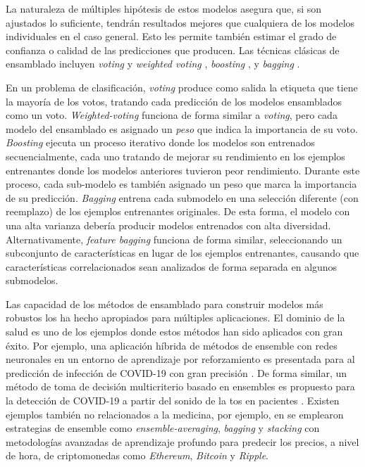 La naturaleza de múltiples hipótesis de estos modelos asegura que, si son ajustados lo suficiente, tendrán resultados mejores que cualquiera de los modelos individuales en el caso general. Esto les permite también estimar el grado de confianza o calidad de las predicciones que producen. Las técnicas clásicas de ensamblado incluyen \emph{voting} y \textit{weighted voting} \parencite{dietterich2000ensemble}, \emph{boosting} \parencite{schapire1990strength}, y \emph{bagging} \parencite{breiman1996bagging}.

En un problema de clasificación, \emph{voting} produce como salida la etiqueta que tiene la mayoría de los votos, tratando cada predicción de los modelos ensamblados como un voto.
\emph{Weighted-voting} funciona de forma similar a \emph{voting}, pero cada modelo del ensamblado es asignado un \emph{peso} que indica la importancia de su voto.
\emph{Boosting} ejecuta un proceso iterativo donde los modelos son entrenados secuencialmente, cada uno tratando de mejorar su rendimiento en los ejemplos entrenantes donde los modelos anteriores tuvieron peor rendimiento.
Durante este proceso, cada sub-modelo es también asignado un peso que marca la importancia de su predicción.
\textit{Bagging} entrena cada submodelo en una selección diferente (con reemplazo) de los ejemplos entrenantes originales.
De esta forma, el modelo con una alta varianza debería producir modelos entrenados con alta diversidad.
Alternativamente, \textit{feature bagging} funciona de forma similar, seleccionando un subconjunto de características en lugar de los ejemplos entrenantes, causando que características correlacionados sean analizados de forma separada en algunos submodelos.

Las capacidad de los métodos de ensamblado para construir modelos más robustos los ha hecho apropiados para múltiples aplicaciones.
El dominio de la salud es uno de los ejemplos donde estos métodos han sido aplicados con gran éxito.
Por ejemplo, una aplicación híbrida de métodos de ensemble con redes neuronales en un entorno de aprendizaje por reforzamiento es presentada para al predicción de infección de COVID-19 con gran precisión \parencite{JIN2022105560}.
De forma similar, un método de toma de decisión multicriterio basado en ensembles es propuesto para la detección de COVID-19 a partir del sonido de la tos en pacientes \parencite{CHOWDHURY2022105405}.
Existen ejemplos también no relacionados a la medicina, por ejemplo, en \parencite{livieris2020ensemble} se emplearon estrategias de ensemble como \textit{ensemble-averaging}, \textit{bagging} y \textit{stacking} con metodologías avanzadas de aprendizaje profundo para predecir los precios, a nivel de hora, de criptomonedas como \textit{Ethereum}, \textit{Bitcoin} y \textit{Ripple}.

